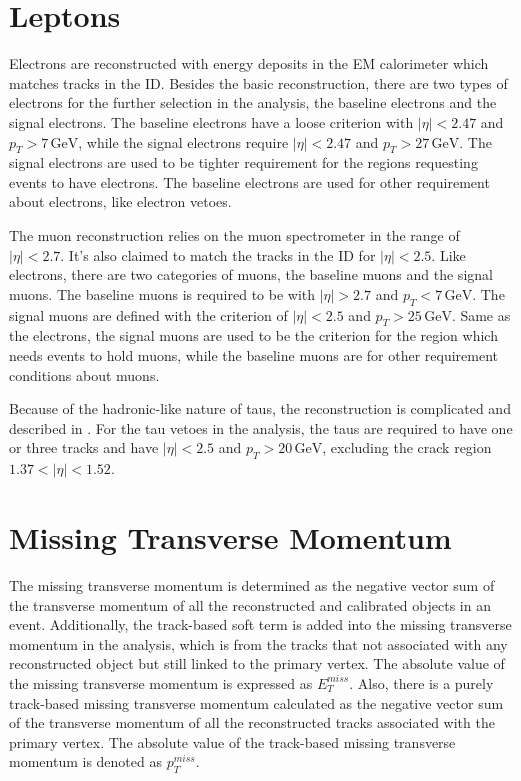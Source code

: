\documentclass[class=NTHU_thesis, crop=false]{standalone}
\begin{document}
\section{Leptons}
Electrons are reconstructed with energy deposits in the EM calorimeter which matches tracks in the ID. Besides the basic reconstruction, there are two types of electrons for the further selection in the analysis, the baseline electrons and the signal electrons. The baseline electrons have a loose criterion with $\left|\eta\right| < 2.47$ and $p_T > 7\, \mathrm{GeV}$, while the signal electrons require $\left|\eta\right| < 2.47$ and $p_T > 27\, \mathrm{GeV}$. The signal electrons are used to be tighter requirement for the regions requesting events to have electrons. The baseline electrons are used for other requirement about electrons, like electron vetoes.

The muon reconstruction relies on the muon spectrometer in the range of $\left|\eta\right| < 2.7$. It's also claimed to match the tracks in the ID for $\left|\eta\right| < 2.5$. Like electrons, there are two categories of muons, the baseline muons and the signal muons. The baseline muons is required to be with $\left|\eta\right| > 2.7$ and $p_T < 7\, \mathrm{GeV}$. The signal muons are defined with the criterion of $\left|\eta\right| < 2.5$ and $p_T > 25\, \mathrm{GeV}$. Same as the electrons, the signal muons are used to be the criterion for the region which needs events to hold muons, while the baseline muons are for other requirement conditions about muons.

Because of the hadronic-like nature of taus, the reconstruction is complicated and described in \cite{ATLAS-CONF-2017-029}. For the tau vetoes in the analysis, the taus are required to have one or three tracks and have $\left|\eta\right| < 2.5$ and $p_T > 20\, \mathrm{GeV}$, excluding the crack region $1.37 < \left|\eta\right| < 1.52$.

\section{Missing Transverse Momentum}
The missing transverse momentum is determined as the negative vector sum of the transverse momentum of all the reconstructed and calibrated objects in an event. Additionally, the track-based soft term is added into the missing transverse momentum in the analysis, which is from the tracks that not associated with any reconstructed object but still linked to the primary vertex. The absolute value of the missing transverse momentum is expressed as $E^{miss}_T$. Also, there is a purely track-based missing transverse momentum calculated as the negative vector sum of the transverse momentum of all the reconstructed tracks associated with the primary vertex. The absolute value of the track-based missing transverse momentum is denoted as $p^{miss}_T$.
\end{document}

